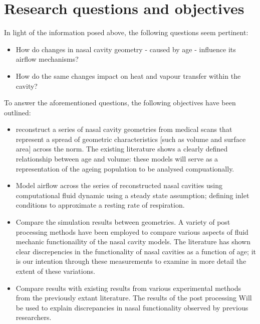 \section{Research questions and objectives}

In light of the information posed above, the following questions seem pertinent:

\begin{itemize}

  \item How do changes in nasal cavity geometry - caused by age - influence its airflow mechanisms?

  \item How do the same changes impact on heat and vapour transfer within the cavity?

\end{itemize}

To answer the aforementioned questions, the following objectives have been outlined:

\begin{itemize}

  \item reconstruct a series of nasal cavity geometries from medical scans that represent a spread of geometric characteristics [such as volume and surface area] across the norm. The existing literature shows a clearly defined relationship between age and volume: these models will serve as a representation of the ageing population to be analysed compuationally.

  \item Model airflow across the series of reconstructed nasal cavities using computational fluid dynamic using a steady state assumption; defining inlet conditions to approximate a resting rate of respiration. 

  \item Compare the simulation results between geometries. A variety of post processing methods have been employed to compare various aspects of fluid mechanic functionaility of the nasal cavity models. The literature has shown clear discrepencies in the functionality of nasal cavities as a function of age; it is our intention through these measurements to examine in more detail the extent of these variations.

  \item  Compare results with existing results from various experimental methods from the previously extant literature. The results of the post processing Will be used to explain discrepancies in nasal functionality observed by previous researchers.

\end{itemize}
 
